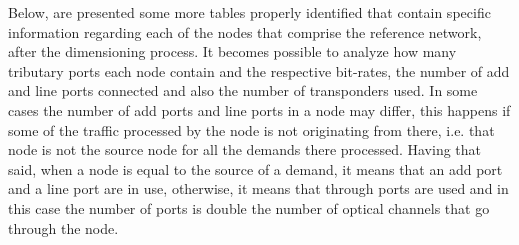 \vspace{11pt}

Below, are presented some more tables properly identified that contain specific information regarding each of the nodes that comprise the reference network, after the dimensioning process. It becomes possible to analyze how many tributary ports each node contain and the respective bit-rates, the number of add and line ports connected and also the number of transponders used. In some cases the number of add ports and line ports in a node may differ, this happens if some of the traffic processed by the node is not originating from there, i.e. that node is not the source node for all the demands there processed. Having that said, when a node is equal to the source of a demand, it means that an add port and a line port are in use, otherwise, it means that through ports are used and in this case the number of ports is double the number of optical channels that go through the node.


